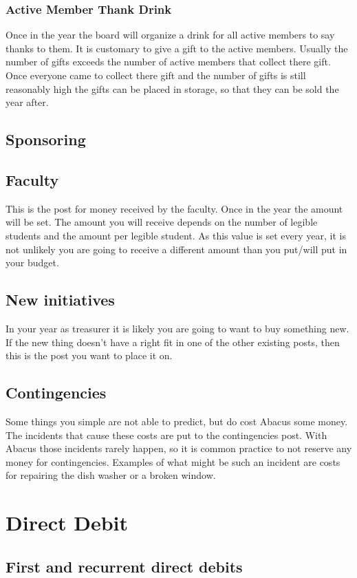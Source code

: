 \documentclass{report}
\begin{document}
\subsubsection{Active Member Thank Drink}
Once in the year the board will organize a drink for all active members to say thanks to them. It is customary to give a gift to the active members. Usually the number of gifts exceeds the number of active members that collect there gift. Once everyone came to collect there gift and the number of gifts is still reasonably high the gifts can be placed in storage, so that they can be sold the year after. 
\subsection{Sponsoring}
\subsection{Faculty}
This is the post for money received by the faculty. Once in the year the amount will be set. The amount you will receive depends on the number of legible students and the amount per legible student. As this value is set every year, it is not unlikely you are going to receive a different amount than you put/will put in your budget.
\subsection{New initiatives}
In your year as treasurer it is likely you are going to want to buy something new. If the new thing doesn't have a right fit in one of the other existing posts, then this is the post you want to place it on.
\subsection{Contingencies}
Some things you simple are not able to predict, but do cost Abacus some money. The incidents that cause these costs are put to the contingencies post. With Abacus those incidents rarely happen, so it is common practice to not reserve any money for contingencies. Examples of what might be such an incident are costs for repairing the dish washer or a broken window.
\section{Direct Debit}
\subsection{First and recurrent direct debits}
\end{document}
